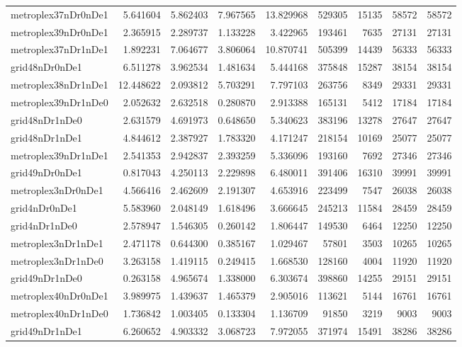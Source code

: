 \begin{longtable}{|l|r|r|r|r|r|r|r|r|}
metroplex37nDr0nDe1 & 5.641604 & 5.862403 & 7.967565 & 13.829968 & 529305 & 15135 & 58572 & 58572 \\
metroplex39nDr0nDe1 & 2.365915 & 2.289737 & 1.133228 & 3.422965 & 193461 & 7635 & 27131 & 27131 \\
metroplex37nDr1nDe1 & 1.892231 & 7.064677 & 3.806064 & 10.870741 & 505399 & 14439 & 56333 & 56333 \\
grid48nDr0nDe1 & 6.511278 & 3.962534 & 1.481634 & 5.444168 & 375848 & 15287 & 38154 & 38154 \\
metroplex38nDr1nDe1 & 12.448622 & 2.093812 & 5.703291 & 7.797103 & 263756 & 8349 & 29331 & 29331 \\
metroplex39nDr1nDe0 & 2.052632 & 2.632518 & 0.280870 & 2.913388 & 165131 & 5412 & 17184 & 17184 \\
grid48nDr1nDe0 & 2.631579 & 4.691973 & 0.648650 & 5.340623 & 383196 & 13278 & 27647 & 27647 \\
grid48nDr1nDe1 & 4.844612 & 2.387927 & 1.783320 & 4.171247 & 218154 & 10169 & 25077 & 25077 \\
metroplex39nDr1nDe1 & 2.541353 & 2.942837 & 2.393259 & 5.336096 & 193160 & 7692 & 27346 & 27346 \\
grid49nDr0nDe1 & 0.817043 & 4.250113 & 2.229898 & 6.480011 & 391406 & 16310 & 39991 & 39991 \\
metroplex3nDr0nDe1 & 4.566416 & 2.462609 & 2.191307 & 4.653916 & 223499 & 7547 & 26038 & 26038 \\
grid4nDr0nDe1 & 5.583960 & 2.048149 & 1.618496 & 3.666645 & 245213 & 11584 & 28459 & 28459 \\
grid4nDr1nDe0 & 2.578947 & 1.546305 & 0.260142 & 1.806447 & 149530 & 6464 & 12250 & 12250 \\
metroplex3nDr1nDe1 & 2.471178 & 0.644300 & 0.385167 & 1.029467 & 57801 & 3503 & 10265 & 10265 \\
metroplex3nDr1nDe0 & 3.263158 & 1.419115 & 0.249415 & 1.668530 & 128160 & 4004 & 11920 & 11920 \\
grid49nDr1nDe0 & 0.263158 & 4.965674 & 1.338000 & 6.303674 & 398860 & 14255 & 29151 & 29151 \\
metroplex40nDr0nDe1 & 3.989975 & 1.439637 & 1.465379 & 2.905016 & 113621 & 5144 & 16761 & 16761 \\
metroplex40nDr1nDe0 & 1.736842 & 1.003405 & 0.133304 & 1.136709 & 91850 & 3219 & 9003 & 9003 \\
grid49nDr1nDe1 & 6.260652 & 4.903332 & 3.068723 & 7.972055 & 371974 & 15491 & 38286 & 38286 \\

\end{longtable}
